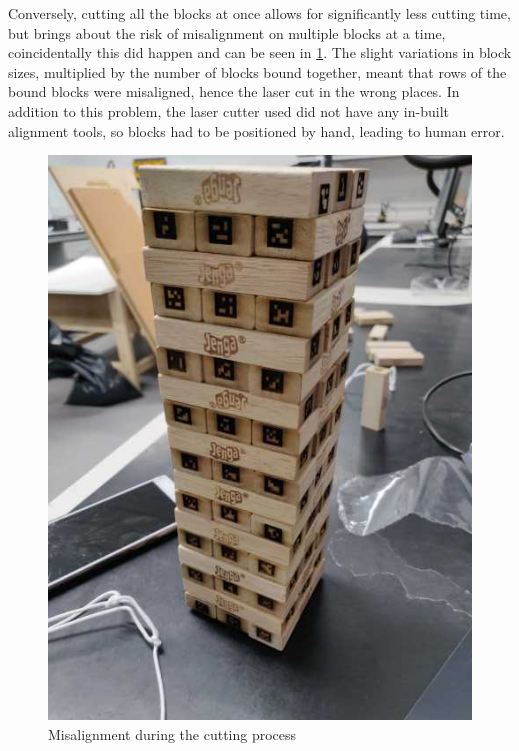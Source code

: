 Conversely, cutting all the blocks at once allows for significantly less cutting time, but brings about the risk of misalignment on multiple blocks at a time, coincidentally this did happen and can be seen in \cref{fig:misalignment}. The slight variations in block sizes, multiplied by the number of blocks bound together, meant that rows of the bound blocks were misaligned, hence the laser cut in the wrong places. In addition to this problem, the laser cutter used did not have any in-built alignment tools, so blocks had to be positioned by hand, leading to human error.

\begin{figure}[ht]
\centering
\begin{minipage}{0.45\textwidth}
  \includegraphics[width=\linewidth]{images/design/misalignment}
  \caption{Misalignment during the cutting process}
  \label{fig:misalignment}
\end{minipage}
\begin{minipage}{0.45\textwidth}

\end{minipage}
\end{figure}
